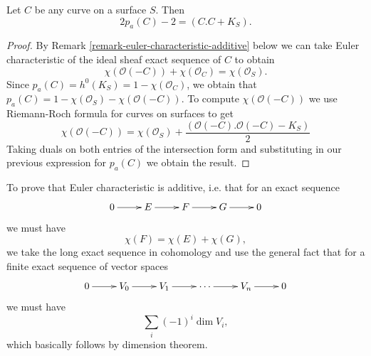 \begin{lemma}
\label{lemma-genus-formula}
Let $C$ be any curve on a surface $S$. Then
\begin{equation}
\label{equation-genus-formula}
2p_a(C)-2=(C.C+K_S).
\end{equation}
\end{lemma}

\begin{proof}
By Remark
\ref{remark-euler-characteristic-additive}
below we can take Euler characteristic
of the ideal sheaf exact sequence of $C$
to obtain
$$
\chi(\mathcal{O}(-C))+\chi(\mathcal{O}_C)=
\chi(\mathcal{O}_S).
$$
Since $p_a(C)=h^0(K_S)
=1-\chi(\mathcal{O}_C)$, we
obtain that
$p_a(C)=1-\chi(\mathcal{O}_S)-
\chi(\mathcal{O}(-C))$.
To compute $\chi(\mathcal{O}(-C))$ we use
Riemann-Roch formula for curves on surfaces
to get
$$
\chi(\mathcal{O}(-C))=\chi(\mathcal{O}_S)
+\frac{(\mathcal{O}(-C).
\mathcal{O}(-C)-K_S)}{2}
$$
Taking duals on both entries of the
intersection form and substituting in our
previous expression for $p_a(C)$ we obtain
the result.
\end{proof}

\begin{remark}
\label{remark-euler-characteristic-additive}
To prove that Euler characteristic is
additive, i.e. that for an exact sequence
$$
\xymatrix{
0\ar[r]
&E\ar[r]
&F\ar[r]
&G\ar[r]
&0
}
$$
we must have
$$
\chi(F)=\chi(E)+\chi(G),
$$
we take the long exact sequence in cohomology
and use the general fact that for
a finite exact sequence of vector spaces
$$
\xymatrix{
0\ar[r]
&V_0\ar[r]
&V_1\ar[r]
&\cdots\ar[r]
&V_n\ar[r]
&0
}
$$
we must have
$$
\sum_i(-1)^i\dim V_i,
$$
which basically follows by dimension theorem.
\end{remark}


